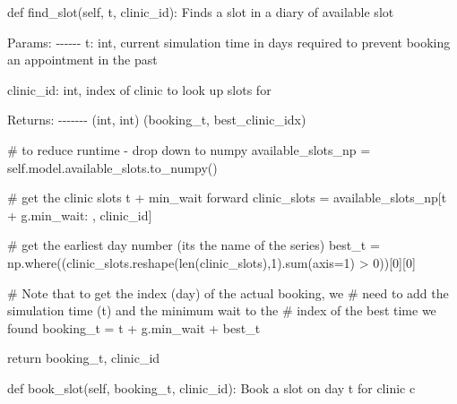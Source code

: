 \documentclass[
  letterpaper,
  DIV=11,
  numbers=noendperiod]{scrreprt}
\newenvironment{Shaded}{\begin{snugshade}}{\end{snugshade}}
\newcommand{\BuiltInTok}[1]{\textcolor[rgb]{0.00,0.23,0.31}{#1}}
\newcommand{\CommentTok}[1]{\textcolor[rgb]{0.37,0.37,0.37}{#1}}
\newcommand{\ControlFlowTok}[1]{\textcolor[rgb]{0.00,0.23,0.31}{#1}}
\newcommand{\DecValTok}[1]{\textcolor[rgb]{0.68,0.00,0.00}{#1}}
\newcommand{\KeywordTok}[1]{\textcolor[rgb]{0.00,0.23,0.31}{#1}}
\newcommand{\NormalTok}[1]{\textcolor[rgb]{0.00,0.23,0.31}{#1}}
\newcommand{\OperatorTok}[1]{\textcolor[rgb]{0.37,0.37,0.37}{#1}}
\newcommand{\VariableTok}[1]{\textcolor[rgb]{0.07,0.07,0.07}{#1}}
\begin{document}
\begin{tcolorbox}
\begin{Shaded}
\begin{Highlighting}[]
    \KeywordTok{def}\NormalTok{ find\_slot(}\VariableTok{self}\NormalTok{, t, clinic\_id):}
        \CommentTok{\textquotesingle{}\textquotesingle{}\textquotesingle{}}
\CommentTok{        Finds a slot in a diary of available slot}

\CommentTok{        Params:}
\CommentTok{        {-}{-}{-}{-}{-}{-}}
\CommentTok{        t: int,}
\CommentTok{            current simulation time in days}
\CommentTok{            required to prevent booking an appointment}
\CommentTok{            in the past}

\CommentTok{        clinic\_id: int,}
\CommentTok{            index of clinic to look up slots for}

\CommentTok{        Returns:}
\CommentTok{        {-}{-}{-}{-}{-}{-}{-}}
\CommentTok{        (int, int)}
\CommentTok{        (booking\_t, best\_clinic\_idx)}

\CommentTok{        \textquotesingle{}\textquotesingle{}\textquotesingle{}}
        \CommentTok{\# to reduce runtime {-} drop down to numpy}
\NormalTok{        available\_slots\_np }\OperatorTok{=} \VariableTok{self}\NormalTok{.model.available\_slots.to\_numpy()}

        \CommentTok{\# get the clinic slots t + min\_wait forward}
\NormalTok{        clinic\_slots }\OperatorTok{=}\NormalTok{ available\_slots\_np[t }\OperatorTok{+}\NormalTok{ g.min\_wait: , clinic\_id]}

        \CommentTok{\# get the earliest day number (its the name of the series)}
\NormalTok{        best\_t }\OperatorTok{=}\NormalTok{ np.where((clinic\_slots.reshape(}\BuiltInTok{len}\NormalTok{(clinic\_slots),}\DecValTok{1}\NormalTok{).}\BuiltInTok{sum}\NormalTok{(axis}\OperatorTok{=}\DecValTok{1}\NormalTok{) }\OperatorTok{\textgreater{}} \DecValTok{0}\NormalTok{))[}\DecValTok{0}\NormalTok{][}\DecValTok{0}\NormalTok{]}

        \CommentTok{\# Note that to get the index (day) of the actual booking, we}
        \CommentTok{\# need to add the simulation time (t) and the minimum wait to the}
        \CommentTok{\# index of the best time we found}
\NormalTok{        booking\_t }\OperatorTok{=}\NormalTok{ t }\OperatorTok{+}\NormalTok{ g.min\_wait }\OperatorTok{+}\NormalTok{ best\_t}

        \ControlFlowTok{return}\NormalTok{ booking\_t, clinic\_id}


    \KeywordTok{def}\NormalTok{ book\_slot(}\VariableTok{self}\NormalTok{, booking\_t, clinic\_id):}
        \CommentTok{\textquotesingle{}\textquotesingle{}\textquotesingle{}}
\CommentTok{        Book a slot on day t for clinic c}


\end{Highlighting}
\end{Shaded}
\end{tcolorbox}
\end{document}
